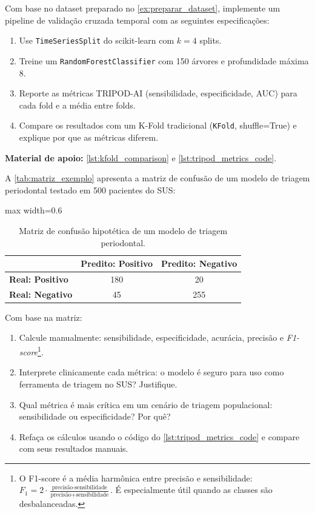 \begin{exercicio}
\label{ex:kfold_temporal}
Com base no dataset preparado no \autoref{ex:preparar_dataset},
implemente um pipeline de validação cruzada temporal com as seguintes
especificações:
\begin{enumerate}
\item Use \texttt{TimeSeriesSplit} do scikit-learn com
\(k = 4\) splits.
\item Treine um \texttt{RandomForestClassifier} com 150 árvores e
profundidade máxima 8.
\item Reporte as métricas TRIPOD-AI (sensibilidade, especificidade,
AUC) para cada fold e a média entre folds.
\item Compare os resultados com um K-Fold tradicional
(\texttt{KFold}, shuffle=True) e explique por que as métricas diferem.
\end{enumerate}
\textbf{Material de apoio:} \autoref{lst:kfold_comparison} e
\autoref{lst:tripod_metrics_code}.
\end{exercicio}

\begin{exercicio}
\label{ex:matriz_confusao}
A \autoref{tab:matriz_exemplo} apresenta a matriz de confusão de um
modelo de triagem periodontal testado em 500 pacientes do SUS:

\begin{table}[htb]
\centering
\caption{Matriz de confusão hipotética de um modelo de triagem
periodontal.}
\label{tab:matriz_exemplo}
\begin{adjustbox}{max width=0.6\textwidth}
\begin{tabular}{lcc}
\toprule
 & \textbf{Predito: Positivo} & \textbf{Predito: Negativo} \\
\midrule
\textbf{Real: Positivo} & 180 & 20 \\
\textbf{Real: Negativo} & 45  & 255 \\
\bottomrule
\end{tabular}
\end{adjustbox}
\end{table}

Com base na matriz:
\begin{enumerate}
\item Calcule manualmente: sensibilidade, especificidade, acurácia,
precisão e \textit{F1-score}\footnote{O F1-score é a média harmônica
entre precisão e sensibilidade: $F_1 = 2 \cdot
\frac{\text{precisão} \cdot \text{sensibilidade}}{\text{precisão} +
\text{sensibilidade}}$. É especialmente útil quando as classes são
desbalanceadas.}.
\item Interprete clinicamente cada métrica: o modelo é seguro para
uso como ferramenta de triagem no SUS? Justifique.
\item Qual métrica é mais crítica em um cenário de triagem
populacional: sensibilidade ou especificidade? Por quê?
\item Refaça os cálculos usando o código do
\autoref{lst:tripod_metrics_code} e compare com seus resultados
manuais.
\end{enumerate}
\end{exercicio}

